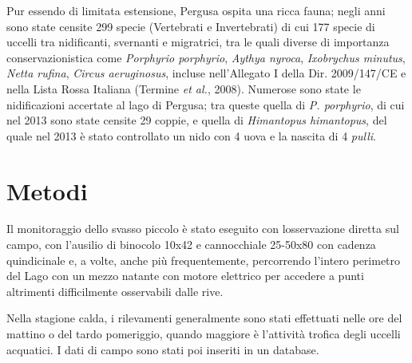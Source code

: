 Pur essendo di limitata estensione, Pergusa ospita una ricca fauna;
negli anni sono state censite 299 specie (Vertebrati e Invertebrati) di
cui 177 specie di uccelli tra nidificanti, svernanti e migratrici, tra
le quali diverse di importanza conservazionistica come
\textit{Porphyrio porphyrio}, \textit{Aythya nyroca},
\textit{Ixobrychus minutus}, \textit{Netta rufina}, \textit{Circus
aeruginosus}, incluse nell{\textquoteright}Allegato I della Dir.
2009/147/CE e nella Lista Rossa Italiana (Termine \textit{et al.},
2008). Numerose sono state le nidificazioni accertate al lago di
Pergusa; tra queste quella di\textit{ P. porphyrio}, di cui nel 2013
sono state censite 29 coppie, e quella di \textit{Himantopus
himantopus}{, }del quale nel 2013 \`e stato
controllato un nido con 4 uova e la nascita di 4 \textit{pulli}.

\section*{Metodi}

Il monitoraggio dello svasso piccolo \`e stato eseguito con
l{\textquotesingle}osservazione diretta sul campo, con
l{\textquoteright}ausilio di binocolo 10x42 e cannocchiale
25-50x80 con cadenza quindicinale e, a volte, anche pi\`u
frequentemente, percorrendo l{\textquoteright}intero perimetro del Lago
con un mezzo natante con motore elettrico per accedere a punti
altrimenti difficilmente osservabili dalle rive.

Nella stagione calda, i rilevamenti generalmente sono stati effettuati
nelle ore del mattino o del tardo pomeriggio, quando maggiore \`e
l{\textquoteright}attivit\`a trofica degli uccelli acquatici. I dati di
campo sono stati poi inseriti in un database.

\newcommand{\gw}{\cellcolor{white}}
\newcommand{\gr}{\cellcolor{white!5!MUSEBLUE}}
\newcommand{\gp}{\cellcolor{white!95!MUSEBLUE}}
\newcommand\crule[3][black]{\textcolor{#1}{\rule{#2}{#3}}}

